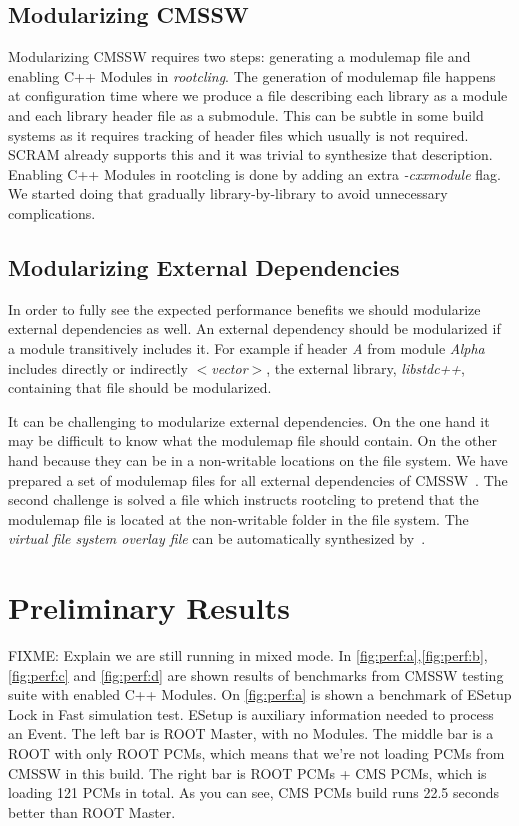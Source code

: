 \documentclass[12pt]{iopart}
\begin{document}
\subsection{Modularizing CMSSW}

Modularizing CMSSW requires two steps: generating a modulemap file and enabling C++ Modules in \textit{rootcling}. The generation of modulemap file happens at configuration time where we produce a file describing each library as a module and each library header file as a submodule. This can be subtle in some build systems as it requires tracking of header files which usually is not required. SCRAM already supports this and it was trivial to synthesize that description. Enabling C++ Modules in rootcling is done by adding an extra \textit{-cxxmodule} flag. We started doing that gradually library-by-library to avoid unnecessary complications.

\subsection{Modularizing External Dependencies}

In order to fully see the expected performance benefits we should modularize external dependencies as well. An external dependency should be modularized if a module transitively includes it. For example if header \textit{A} from module \textit{Alpha} includes directly or indirectly \textit{$<$vector$>$}, the external library, \textit{libstdc++}, containing that file should be modularized.

It can be challenging to modularize external dependencies. On the one hand it may be difficult to know what the modulemap file should contain. On the other hand because they can be in a non-writable locations on the file system. We have prepared a set of modulemap files for all external dependencies of CMSSW~\cite{raphael-auto-Modules}. The second challenge is solved a file which instructs rootcling to pretend that the modulemap file is located at the non-writable folder in the file system. The \textit{virtual file system overlay file} can be automatically synthesized by~\cite{raphael-auto-Modules}.


\section{Preliminary Results}
\label{results}
FIXME: Explain we are still running in mixed mode.
In \ref{fig:perf:a},\ref{fig:perf:b},\ref{fig:perf:c} and \ref{fig:perf:d} are shown results of benchmarks from CMSSW testing suite with enabled C++ Modules. On \ref{fig:perf:a} is shown a benchmark of ESetup Lock in Fast simulation test. ESetup is auxiliary information needed to process an Event. The left bar is ROOT Master, with no Modules. The middle bar is a ROOT with only ROOT PCMs, which means that we're not loading PCMs from CMSSW in this build. The right bar is ROOT PCMs + CMS PCMs, which is loading 121 PCMs in total. As you can see, CMS PCMs build runs 22.5 seconds better than ROOT Master.
\end{document}
